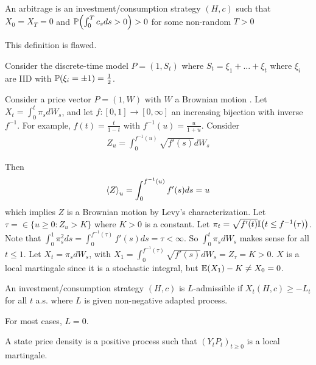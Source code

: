 \begin{defn}[Incomplete]
  \label{defn:continuous_time:19}
  An arbitrage is an investment/consumption strategy $(H, c)$ such
  that $X_{0} = X_{T} = 0$ and $\Prob{\int_{0}^{T} c_{s} ds > 0} > 0$
  for some non-random $T > 0$
\end{defn}

This definition is flawed.

\begin{exmp}
  \label{defn:continuous_time:20}
  Consider the discrete-time model $P = (1, S_{t})$ where $S_{t} =
  \xi_{1} + \dots + \xi_{t}$ where $\xi_{i}$ are IID with
  $\Prob{\xi_{i} = \pm 1} = \frac{1}{2}$.
\end{exmp}

Consider a price vector $P = (1, W)$ with $W$ a Brownian motion . Let
$X_{t} = \int_{0}^{t} \pi_{s} dW_{s}$, and let $f: [0, 1] \rightarrow
[0, \infty]$ an increasing bijection with inverse $f^{-1}$.  For
example, $f(t) = \frac{t}{1-t}$ with $f^{-1}(u) = \frac{u}{1+u}$.
Consider
\begin{align}
  \label{eq:57}
  Z_{u} = \int_{0}^{f^{-1}(u)} \sqrt{f'(s)} dW_{s}
\end{align}

Then
\begin{align}
  \label{eq:58}
  \IP{ Z }_{u} = \int_{0}^{f^{-1}(u)} f'(s) ds = u
\end{align} which implies $Z$ is a Brownian motion by Levy's
characterization.  Let $\tau = \in \{ u \geq 0 : Z_{u} > K \}$ where
$K > 0$ is a constant.  Let $\pi_{t} = \sqrt{f'(t)} \I{t \leq
  f^{-1}(\tau)}$.  Note that $\int_{0}^{1} \pi^{2}_{s} ds =
\int_{0}^{f^{-1}(\tau)} f'(s) ds = \tau < \infty$.  So $\int_{0}^{t}
\pi_{s} dW_{s}$ makes sense for all $t \leq 1$.  Let $X_{t} = \pi_{s}
dW_{s}$, with $X_{1} = \int_{0}^{f^{-1}(\tau)} \sqrt{f'(s)} dW_{s} =
Z_{\tau} = K > 0$.  $X$ is a local martingale since it is a stochastic
integral, but $\E{X_{1}} - K \neq X_{0} = 0$.

\begin{defn}
  \label{defn:continuous_time:21}
  An investment/consumption strategy $(H, c)$ is $L$-admissible if
  $X_{t}(H, c) \geq -L_{t}$ for all $t$ a.s. where $L$ is given
  non-negative adapted process.

  For most cases, $L = 0$.
\end{defn}

\begin{defn}
  \label{defn:continuous_time:22}
  A state price density is a positive \ito process such that $(Y_{t}
  P_{t})_{t \geq 0}$ is a local martingale.
\end{defn}

